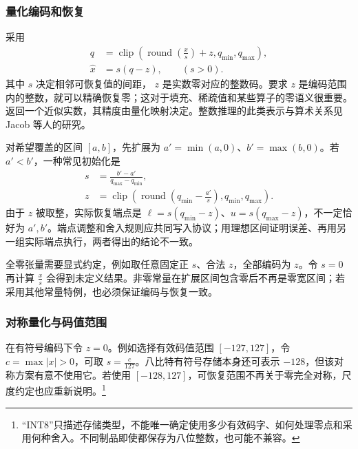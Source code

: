 \documentclass[../textbook.tex]{subfiles}
\begin{document}
\subsubsection{量化编码和恢复}
采用
\begin{equation}\label{eq:opt-affine}
\begin{aligned}
 q &= \operatorname{clip}\!\left(\operatorname{round}(\frac{x}{s})+z,q_{\min},q_{\max}\right), \\
 \widehat x &= s(q-z), \qquad (s>0).
\end{aligned}
\end{equation}
其中 $s$ 决定相邻可恢复值的间距， $z$ 是实数零对应的整数码。要求 $z$ 是编码范围内的整数，就可以精确恢复零；这对于填充、稀疏值和某些算子的零语义很重要。返回一个近似实数，其精度由量化映射决定。整数推理的此类表示与算术关系见 Jacob 等人的研究\cite{jacob2018integerquantization}。

对希望覆盖的区间 $[a,b]$，先扩展为 $a'=\min(a,0)$、$b'=\max(b,0)$。若 $a'<b'$，一种常见初始化是
\begin{equation}\label{eq:opt-parameters}
\begin{aligned}
 s &= \frac{b'-a'}{q_{\max}-q_{\min}}, \\
 z &= \operatorname{clip}\!\left(\operatorname{round}(q_{\min}-\frac{a'}{s}),q_{\min},q_{\max}\right).
\end{aligned}
\end{equation}
由于 $z$ 被取整，实际恢复端点是 $\ell=s(q_{\min}-z)$、$u=s(q_{\max}-z)$，不一定恰好为 $a',b'$。端点调整和舍入规则应共同写入协议；用理想区间证明误差、再用另一组实际端点执行，两者得出的结论不一致。

全零张量需要显式约定，例如取任意固定正 $s$、合法 $z$，全部编码为 $z$。令 $s=0$ 再计算 $\frac{x}{s}$ 会得到未定义结果。非零常量在扩展区间包含零后不再是零宽区间；若采用其他常量特例，也必须保证编码与恢复一致。

\subsubsection{对称量化与码值范围}
在有符号编码下令 $z=0$。例如选择有效码值范围 $[-127,127]$，令 $c=\max|x|>0$，可取 $s=\frac{c}{127}$。八比特有符号存储本身还可表示 $-128$，但该对称方案有意不使用它。若使用 $[-128,127]$，可恢复范围不再关于零完全对称，尺度约定也应重新说明。\footnote{“INT8”只描述存储类型，不能唯一确定使用多少有效码字、如何处理零点和采用何种舍入。不同制品即使都保存为八位整数，也可能不兼容。}
\end{document}
